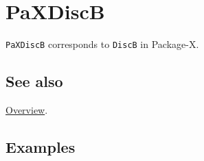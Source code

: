 \documentclass[../FeynHelpersManual.tex]{subfiles}
\begin{document}
\hypertarget{paxdiscb}{
\section{PaXDiscB}\label{paxdiscb}}

\texttt{PaXDiscB} corresponds to \texttt{DiscB} in Package-X.

\subsection{See also}

\hyperlink{toc}{Overview}.

\subsection{Examples}
\end{document}
